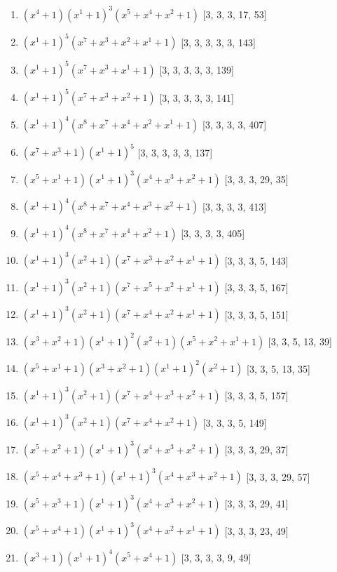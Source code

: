 \documentclass[10pt,twocolumn]{article}
\begin{document}
\begin{enumerate}
\item $(x^{4} + 1)(x^{1} + 1)^{3}(x^{5} + x^{4} + x^{2} + 1)$  [3, 3, 3, 17, 53]
\item $(x^{1} + 1)^{5}(x^{7} + x^{3} + x^{2} + x^{1} + 1)$  [3, 3, 3, 3, 3, 143]
\item $(x^{1} + 1)^{5}(x^{7} + x^{3} + x^{1} + 1)$  [3, 3, 3, 3, 3, 139]
\item $(x^{1} + 1)^{5}(x^{7} + x^{3} + x^{2} + 1)$  [3, 3, 3, 3, 3, 141]
\item $(x^{1} + 1)^{4}(x^{8} + x^{7} + x^{4} + x^{2} + x^{1} + 1)$  [3, 3, 3, 3, 407]
\item $(x^{7} + x^{3} + 1)(x^{1} + 1)^{5}$  [3, 3, 3, 3, 3, 137]
\item $(x^{5} + x^{1} + 1)(x^{1} + 1)^{3}(x^{4} + x^{3} + x^{2} + 1)$  [3, 3, 3, 29, 35]
\item $(x^{1} + 1)^{4}(x^{8} + x^{7} + x^{4} + x^{3} + x^{2} + 1)$  [3, 3, 3, 3, 413]
\item $(x^{1} + 1)^{4}(x^{8} + x^{7} + x^{4} + x^{2} + 1)$  [3, 3, 3, 3, 405]
\item $(x^{1} + 1)^{3}(x^{2} + 1)(x^{7} + x^{3} + x^{2} + x^{1} + 1)$  [3, 3, 3, 5, 143]
\item $(x^{1} + 1)^{3}(x^{2} + 1)(x^{7} + x^{5} + x^{2} + x^{1} + 1)$  [3, 3, 3, 5, 167]
\item $(x^{1} + 1)^{3}(x^{2} + 1)(x^{7} + x^{4} + x^{2} + x^{1} + 1)$  [3, 3, 3, 5, 151]
\item $(x^{3} + x^{2} + 1)(x^{1} + 1)^{2}(x^{2} + 1)(x^{5} + x^{2} + x^{1} + 1)$  [3, 3, 5, 13, 39]
\item $(x^{5} + x^{1} + 1)(x^{3} + x^{2} + 1)(x^{1} + 1)^{2}(x^{2} + 1)$  [3, 3, 5, 13, 35]
\item $(x^{1} + 1)^{3}(x^{2} + 1)(x^{7} + x^{4} + x^{3} + x^{2} + 1)$  [3, 3, 3, 5, 157]
\item $(x^{1} + 1)^{3}(x^{2} + 1)(x^{7} + x^{4} + x^{2} + 1)$  [3, 3, 3, 5, 149]
\item $(x^{5} + x^{2} + 1)(x^{1} + 1)^{3}(x^{4} + x^{3} + x^{2} + 1)$  [3, 3, 3, 29, 37]
\item $(x^{5} + x^{4} + x^{3} + 1)(x^{1} + 1)^{3}(x^{4} + x^{3} + x^{2} + 1)$  [3, 3, 3, 29, 57]
\item $(x^{5} + x^{3} + 1)(x^{1} + 1)^{3}(x^{4} + x^{3} + x^{2} + 1)$  [3, 3, 3, 29, 41]
\item $(x^{5} + x^{4} + 1)(x^{1} + 1)^{3}(x^{4} + x^{2} + x^{1} + 1)$  [3, 3, 3, 23, 49]
\item $(x^{3} + 1)(x^{1} + 1)^{4}(x^{5} + x^{4} + 1)$  [3, 3, 3, 3, 9, 49]

\end{enumerate}
\end{document}
